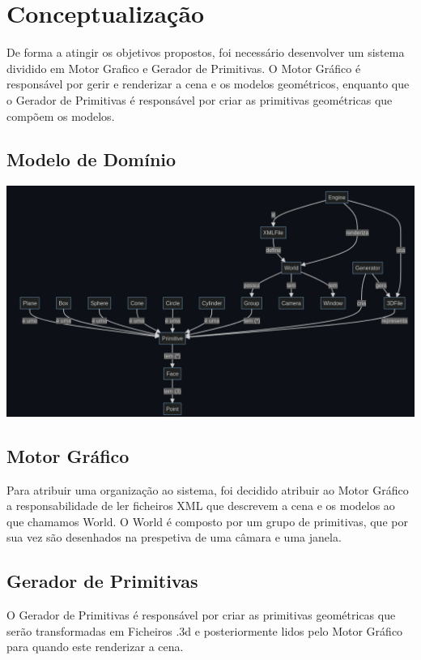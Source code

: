 \section{Conceptualização}

De forma a atingir os objetivos propostos, foi necessário desenvolver um sistema
dividido em Motor Grafico e Gerador de Primitivas. O Motor Gráfico é responsável
por gerir e renderizar a cena e os modelos geométricos, enquanto que o Gerador de Primitivas
é responsável por criar as primitivas geométricas que compõem os modelos. 


\subsection{Modelo de Domínio}

\includegraphics[width=15cm]{ModeloDominio.png}\\[\bigskipamount]

\subsection{Motor Gráfico}

Para atribuir uma organização ao sistema, foi decidido atribuir ao Motor Gráfico a
responsabilidade de ler ficheiros XML que descrevem a cena e os modelos ao que chamamos 
World. O World é composto por um grupo de primitivas, que por sua vez são
desenhados na prespetiva de uma câmara e uma janela.

\subsection{Gerador de Primitivas}

O Gerador de Primitivas é responsável por criar as primitivas geométricas que serão
transformadas em Ficheiros .3d e posteriormente lidos pelo Motor Gráfico para
quando este renderizar a cena.

